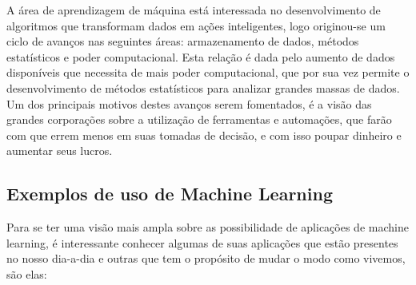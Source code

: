A área de aprendizagem de máquina está interessada no desenvolvimento de algoritmos que transformam dados em ações inteligentes, logo originou-se
um ciclo de avanços nas seguintes áreas: armazenamento de dados, métodos estatísticos e poder computacional. 
Esta relação é dada pelo aumento de dados disponíveis que necessita de 
mais poder computacional, que por sua vez permite o desenvolvimento de métodos estatísticos para analizar grandes massas de dados. Um dos principais motivos destes avanços serem fomentados, 
é a visão das grandes corporações sobre a utilização de ferramentas e automações, que farão com que errem menos em suas tomadas de decisão, e com isso poupar dinheiro e aumentar seus lucros.

\subsection{Exemplos de uso de Machine Learning}
\label{cap:exemplos-ml}

Para se ter uma visão mais ampla sobre as possibilidade de aplicações de machine learning,
 é interessante conhecer algumas de suas aplicações que estão presentes no nosso dia-a-dia e outras que tem o propósito de 
 mudar o modo como vivemos, são elas:

